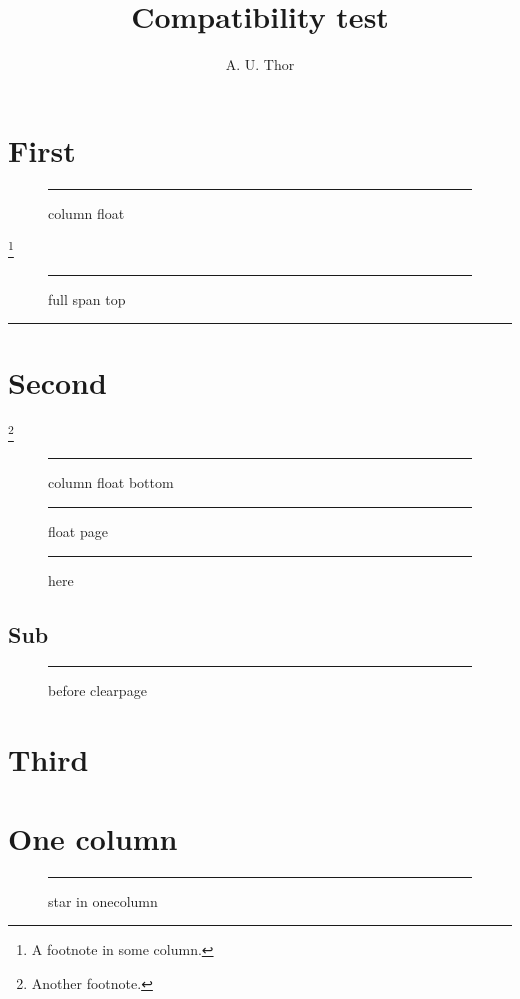 \usepackage{lipsum}
\setlength\columnseprule{.4pt}
\pagestyle{headings}
\title{Compatibility test}\author{A. U. Thor}\date{}

\maketitle
\begin{abstract}\lipsum[1][1-4]\end{abstract}
\section{First}
\lipsum[1-3]
\begin{figure}[t]\centering\rule{.8\linewidth}{2cm}\caption{column float}\end{figure}
\lipsum[5-7]\footnote{A footnote in some column.}
\begin{figure}[t]\centering\rule{.8\linewidth}{3cm}\caption{full span top}\end{figure}
\begin{table}\centering\rule{.6\linewidth}{2cm}\caption{default table star}\end{table}
\section{Second}
\lipsum[8-12]\footnote{Another footnote.}
\begin{figure}[b]\centering\rule{.8\linewidth}{2cm}\caption{column float bottom}\end{figure}
\begin{figure}[p]\centering\rule{.8\linewidth}{12cm}\caption{float page}\end{figure}
\lipsum[13-22]
\begin{figure}[htbp]\centering\rule{.8\linewidth}{1cm}\caption{here}\end{figure}
\subsection{Sub}
\lipsum[23-30]
\begin{figure}[t]\centering\rule{.8\linewidth}{3cm}\caption{before clearpage}\end{figure}
\lipsum[31]
\clearpage
\section{Third}
\lipsum[32-36]
\lipsum[37-45]
\enlargethispage{2\baselineskip}
\lipsum[46-52]
\onecolumn
\section{One column}
\lipsum[1-3]
\begin{figure}[t]\centering\rule{.8\linewidth}{3cm}\caption{star in onecolumn}\end{figure}
\twocolumn
\lipsum[4-12]

